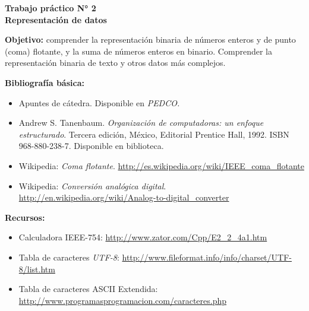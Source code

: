 \documentclass[12pt]{article}
\def\maketitle{

\makeatletter
{\color{bl} \centering \huge \sc \textbf{ Trabajo práctico N° 2\\ \large
\vspace*{-8pt} \color{black} Representación de datos\vspace*{8pt} }\par}
\makeatother

\makeatletter


}
\begin{document}
\thispagestyle{empty}
\maketitle
\setlength{\parindent}{1pt}

\textbf{Objetivo:} comprender la representación binaria de números enteros y
de punto (coma) flotante, y la suma de números enteros en binario. Comprender
la representación binaria de texto y otros datos más complejos.

\textbf{Bibliografía básica:}

\vspace{-2\topsep}
\begin{itemize}

    \itemsep2pt \parskip0pt 

    \item Apuntes de cátedra. Disponible en \it{PEDCO}.

    \item Andrew S. Tanenbaum. \emph{Organización de computadoras: un enfoque
        estructurado}. Tercera edición, México, Editorial Prentice Hall, 1992.
        ISBN 968-880-238-7. Disponible en biblioteca.

    \item Wikipedia: \emph{Coma flotante}.
        \url{http://es.wikipedia.org/wiki/IEEE_coma_flotante}
    
    \item Wikipedia: \emph{Conversión analógica digital}.
        \url{http://en.wikipedia.org/wiki/Analog-to-digital_converter}

\end{itemize}

\textbf{Recursos:}

\vspace{-2\topsep}
\begin{itemize}

    \itemsep2pt \parskip0pt 

    \item Calculadora IEEE-754: \url{http://www.zator.com/Cpp/E2_2_4a1.htm}

    \item Tabla de caracteres \emph{UTF-8}:
        \url{http://www.fileformat.info/info/charset/UTF-8/list.htm}

    \item Tabla de caracteres ASCII Extendida:
        \url{http://www.programasprogramacion.com/caracteres.php}

\end{itemize}
\end{document}
